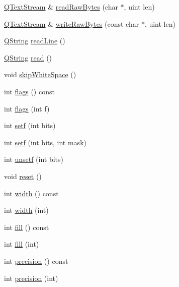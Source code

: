\begin{DoxyCompactItemize}
\item 
\hyperlink{class_q_text_stream}{Q\-Text\-Stream} \& \hyperlink{class_q_text_stream_a43fa5362eacd17fa8e91a1bc4d4e02ea}{read\-Raw\-Bytes} (char $\ast$, uint len)
\item 
\hyperlink{class_q_text_stream}{Q\-Text\-Stream} \& \hyperlink{class_q_text_stream_a9c085a2281ddc251764a73595aab6781}{write\-Raw\-Bytes} (const char $\ast$, uint len)
\item 
\hyperlink{class_q_string}{Q\-String} \hyperlink{class_q_text_stream_aa4835afcc121a9e07102e8e98f315483}{read\-Line} ()
\item 
\hyperlink{class_q_string}{Q\-String} \hyperlink{class_q_text_stream_a5e5005e2f7a438e19865ebc36ceaf6d5}{read} ()
\item 
void \hyperlink{class_q_text_stream_ae74b6a10f91f5bcc9ff80aa8f5301d8e}{skip\-White\-Space} ()
\item 
int \hyperlink{class_q_text_stream_a5f944e30665d7e6775691e5fc63e9dc7}{flags} () const 
\item 
int \hyperlink{class_q_text_stream_a2717ceac62fef11f8bb5d9f1ddf403f5}{flags} (int f)
\item 
int \hyperlink{class_q_text_stream_aef4e89706abbd9d4f9819f3ca879ac1e}{setf} (int bits)
\item 
int \hyperlink{class_q_text_stream_a1fdf393ab6159b448a5b4638f1fde536}{setf} (int bits, int mask)
\item 
int \hyperlink{class_q_text_stream_aeb8b952a998d00528f6540b4d8d66c0b}{unsetf} (int bits)
\item 
void \hyperlink{class_q_text_stream_ad20897c5c8bd47f5d4005989bead0e55}{reset} ()
\item 
int \hyperlink{class_q_text_stream_a369399896761e31ae71db57fdd0ba431}{width} () const 
\item 
int \hyperlink{class_q_text_stream_aa34b57469541d48e13caaec8d78925ea}{width} (int)
\item 
int \hyperlink{class_q_text_stream_a7dae2ac6e6ed263a46e8e7e95cdea69f}{fill} () const 
\item 
int \hyperlink{class_q_text_stream_af062e37919071a3e6a99d4b56abdf374}{fill} (int)
\item 
int \hyperlink{class_q_text_stream_a27f092ced0bab73e8b77a1b633d430d2}{precision} () const 
\item 
int \hyperlink{class_q_text_stream_a6aa7be43eec76dc78be9b285ffcd5fcc}{precision} (int)
\end{DoxyCompactItemize}
